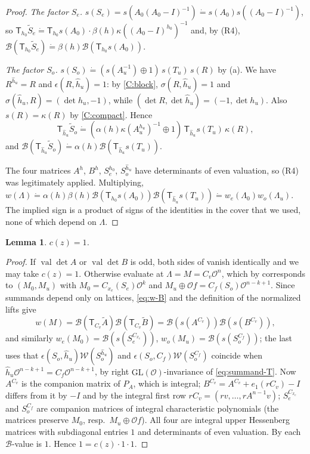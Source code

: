 \documentclass[11pt,oneside,notitlepage]{book}
\numberwithin{equation}{section}
\theoremstyle{plain}
\newtheorem{lemma}[theorem]{Lemma}
\theoremstyle{definition}
\newcommand{\cO}{\mathcal{O}}
\newcommand{\GL}{\mathrm{GL}}
\newcommand{\cW}{\mathcal{W}}
\newcommand{\cB}{\mathcal{B}}
\newcommand{\val}{\operatorname{val}}
\newcommand{\hil}[2]{(#1,#2)}
\newcommand{\T}{\mathsf{T}}
\renewcommand{\doteqdot}{\mathrel{\dot=}}
\begin{document}
\begin{proof}
\emph{The factor $S_e$.} $s(S_e)=s(A_0(A_0-I)^{-1})\doteqdot s(A_0)s((A_0-I)^{-1})$, so $\T_{h_0}\tilde S_e\doteqdot\T_{h_0}s(A_0)\cdot\beta(h)\kappa((A_0-I)^{h_0})^{-1}$ and, by (R4), $\cB(\T_{h_0}\tilde S_e)\doteqdot\beta(h)\cB(\T_{h_0}s(A_0))$.

\emph{The factor $S_o$.} $s(S_o)\doteqdot(s(A_u^{-1})\oplus1)\,s(T_u)\,s(R)$ by (a). We have $R^{\hat h_u}=R$ and $\epsilon(R,\hat h_u)=1$: by \ref{C:block}, $\sigma(R,\hat h_u)=1$ and $\sigma(\hat h_u,R)=\hil{\det h_u}{-1}$, while $\hil{\det R}{\det\hat h_u}=\hil{-1}{\det h_u}$. Also $s(R)=\kappa(R)$ by \ref{C:compact}. Hence
\[\T_{\hat h_u}\tilde S_o\doteqdot(\alpha(h)\kappa(A_u^{h_u})^{-1}\oplus1)\,\T_{\hat h_u}s(T_u)\,\kappa(R),\]
and $\cB(\T_{\hat h_u}\tilde S_o)\doteqdot\alpha(h)\cB(\T_{\hat h_u}s(T_u))$.

The four matrices $A^h$, $B^h$, $S_e^{h_0}$, $S_o^{\hat h_u}$ have determinants of even valuation, so (R4) was legitimately applied. Multiplying, $w(\Lambda)\doteqdot\alpha(h)\beta(h)\cB(\T_{h_0}s(A_0))\cB(\T_{\hat h_u}s(T_u))\doteqdot w_e(\Lambda_0)w_o(\Lambda_u)$. The implied sign is a product of signs of the identities in the cover that we used, none of which depend on $\Lambda$.
\end{proof}

\begin{lemma}\label{lem:c=1}
$c(z)=1$.
\end{lemma}
\begin{proof}
If $\val\det A$ or $\val\det B$ is odd, both sides of  vanish identically and we may take $c(z)=1$. Otherwise evaluate at $\Lambda=M=C_v\cO^n$, which by  corresponds to $(M_0,M_u)$ with $M_0=C_{x_e}(S_e)\cO^k$ and $M_u\oplus\cO f=C_f(S_o)\cO^{n-k+1}$. Since summands depend only on lattices, \eqref{eq:w-B} and the definition of the normalized lifts give
\[w(M)=\cB(\T_{C_v}\tilde A)\cB(\T_{C_v}\tilde B)=\cB(s(A^{C_v}))\cB(s(B^{C_v})),\]
and similarly $w_e(M_0)=\cB(s(S_e^{C_{x_e}}))$, $w_o(M_u)=\cB(s(S_o^{C_f}))$; the last uses that $\epsilon(S_o,\hat h_u)\cW(S_o^{\hat h_u})$ and $\epsilon(S_o,C_f)\cW(S_o^{C_f})$ coincide when $\hat h_u\cO^{n-k+1}=C_f\cO^{n-k+1}$, by right $\GL(\cO)$-invariance of \eqref{eq:summand-T}. Now $A^{C_v}$ is the companion matrix of $P_A$, which is integral; $B^{C_v}=A^{C_v}+e_1(rC_v)-I$ differs from it by $-I$ and by the integral first row $rC_v=(rv,\dots,rA^{n-1}v)$; $S_e^{C_{x_e}}$ and $S_o^{C_f}$ are companion matrices of integral characteristic polynomials (the matrices preserve $M_0$, resp.\ $M_u\oplus\cO f$). All four are integral upper Hessenberg matrices with subdiagonal entries $1$ and determinants of even valuation. By  each $\cB$-value is $1$. Hence $1=c(z)\cdot1\cdot1$.
\end{proof}
\end{document}
